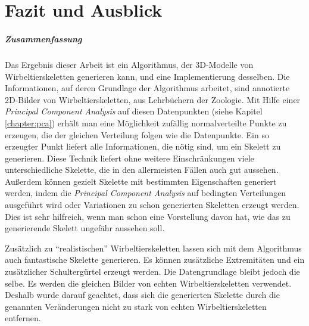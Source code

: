 \chapter{Fazit und Ausblick}
\label{chapter:conclusion}

% 
% 

\paragraph{Zusammenfassung}

Das Ergebnis dieser Arbeit ist ein Algorithmus, der 3D-Modelle von Wirbeltierskeletten generieren kann, und eine Implementierung desselben. Die Informationen, auf deren Grundlage der Algorithmus arbeitet, sind annotierte 2D-Bilder von Wirbeltierskeletten, \zb aus Lehrbüchern der Zoologie. Mit Hilfe einer \emph{Principal Component Analysis} auf diesen Datenpunkten (siehe Kapitel \ref{chapter:pca}) erhält man eine Möglichkeit zufällig normalverteilte Punkte zu erzeugen, die der gleichen Verteilung folgen wie die Datenpunkte.
Ein so erzeugter Punkt liefert alle Informationen, die nötig sind, um ein Skelett zu generieren.
Diese Technik liefert ohne weitere Einschränkungen viele unterschiedliche Skelette, die in den allermeisten Fällen auch gut aussehen.\\
Außerdem können gezielt Skelette mit bestimmten Eigenschaften generiert werden, indem die \emph{Principal Component Analysis} auf bedingten Verteilungen ausgeführt wird oder Variationen zu schon generierten Skeletten erzeugt werden. Dies ist sehr hilfreich, wenn man schon eine Vorstellung davon hat, wie das zu generierende Skelett ungefähr aussehen soll.

Zusätzlich zu "`realistischen"' Wirbeltierskeletten lassen sich mit dem Algorithmus auch fantastische Skelette generieren. Es können zusätzliche Extremitäten und ein zusätzlicher Schultergürtel erzeugt werden.
Die Datengrundlage bleibt jedoch die selbe. Es werden die gleichen Bilder von echten Wirbeltierskeletten verwendet.
Deshalb wurde darauf geachtet, dass sich die generierten Skelette durch die genannten Veränderungen nicht zu stark von echten Wirbeltierskeletten entfernen.  

